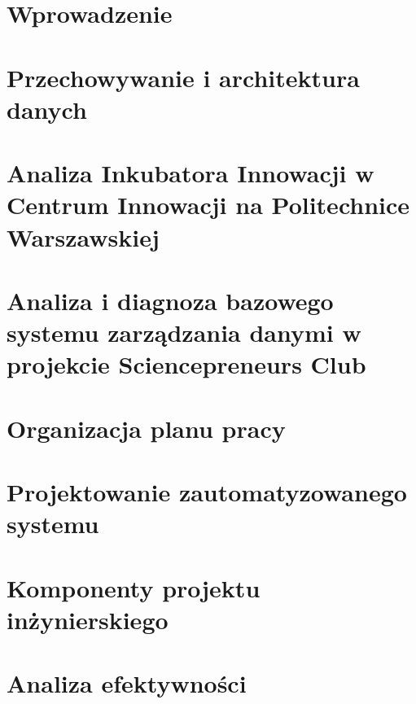 \documentclass[a4paper,twoside,11pt]{report}
\begin{document}


\newpage


\newpage
\tableofcontents


\chapter{Wprowadzenie}


\chapter{Przechowywanie i architektura danych}


\chapter{Analiza Inkubatora Innowacji w Centrum Innowacji na Politechnice Warszawskiej}


\chapter{Analiza i diagnoza bazowego systemu zarządzania danymi w projekcie Sciencepreneurs Club}


\chapter{Organizacja planu pracy}


\chapter{Projektowanie zautomatyzowanego systemu}


\chapter{Komponenty projektu inżynierskiego}


\chapter{Analiza efektywności}

\end{document}
